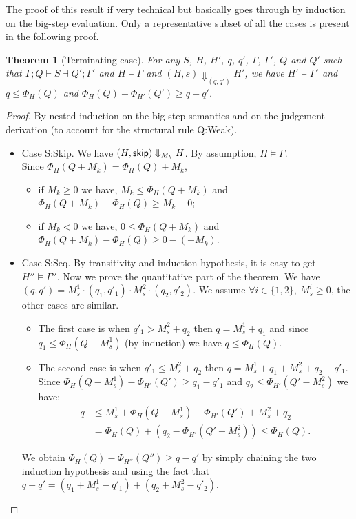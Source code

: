 \documentclass[10pt]{article}
\newtheorem{theorem}{Theorem}
\begin{document}
The proof of this result if very technical but basically goes through by induction
on the big-step evaluation.  Only a representative subset of all the cases
is present in the following proof.


\begin{theorem}[Terminating case]
For any $S$, $H$, $H'$, $q$, $q'$, $\Gamma$, $\Gamma'$, $Q$ and $Q'$ such
that $\Gamma; Q \vdash S \dashv Q'; \Gamma'$ and $H \models \Gamma$ and
$(H,s) \Downarrow_{(q,q')} H'$, we have
$H' \models \Gamma'$ and
$q \le \Phi_H(Q)$ and
$\Phi_H(Q) - \Phi_{H'}(Q') \ge q - q'$.
\end{theorem}

\begin{proof} By nested induction on the big step semantics and on the
judgement derivation (to account for the structural rule {\sc Q:Weak}).

\begin{itemize}

\item Case {\sc S:Skip}.
  We have $(H, \mathsf{skip}) \Downarrow_{M_k} H$.
  By assumption, $H \models \Gamma$. \\
  Since $\Phi_H(Q + M_k) = \Phi_H(Q) + M_k$,
  \begin{itemize}[topsep=0pt]
  \item
    if $M_k \ge 0$ we have,
      $M_k \le \Phi_H(Q + M_k)$ and
      $\Phi_H(Q + M_k) - \Phi_H(Q) \ge M_k - 0$;
  \item
    if $M_k < 0$ we have,
      $0 \le \Phi_H(Q + M_k)$ and
      $\Phi_H(Q + M_k) - \Phi_H(Q) \ge 0 - (-M_k)$.
  \end{itemize}

\item Case {\sc S:Seq}.
  By transitivity and induction hypothesis, it is
  easy to get $H'' \models \Gamma''$.  Now we prove
  the quantitative part of the theorem.  We have
  $(q, q') = M_s^1 \cdot (q_1, q'_1) \cdot M_s^2 \cdot (q_2, q'_2)$.
  We assume $\forall i \in \{1, 2\},~M_s^i \ge 0$, the other cases
  are similar.
  \begin{itemize}[topsep=0pt]
  \item
    The first case is when $q'_1 > M_s^2 + q_2$ then $q = M_s^1 + q_1$
    and since $q_1 \le \Phi_H(Q - M_s^1)$ (by induction) we have
    $q \le \Phi_H(Q)$.
  \item
    The second case is when $q'_1 \le M_s^2 + q_2$ then $q = M_s^1 + q_1 + M_s^2 + q_2 - q'_1$. \\
    Since $\Phi_H(Q - M_s^1) - \Phi_{H'}(Q') \ge q_1 - q'_1$
    and $q_2 \le \Phi_{H'}(Q' - M_s^2)$ we have:
    \begin{align*}
    q &\le M_s^1 + \Phi_H(Q - M_s^1) - \Phi_{H'}(Q') + M_s^2 + q_2 \\
      &= \Phi_H(Q) + (q_2 - \Phi_{H'}(Q' - M_s^2)) \le \Phi_H(Q).
   \end{align*}
  \end{itemize}
  We obtain $\Phi_H(Q) - \Phi_{H''}(Q'') \ge q - q'$ by simply chaining
  the two induction hypothesis and using the fact that $q - q' =
  (q_1 + M_s^1 - q'_1) + (q_2 + M_s^2 - q'_2)$.


\end{itemize}
\end{proof}
\end{document}
